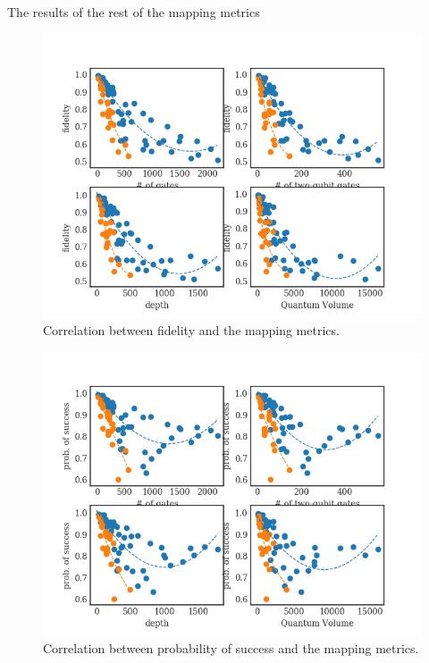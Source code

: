 The results of the rest of the mapping metrics 

\begin{figure}[htbp]
\centering
\includegraphics[width=\textwidth]{figures/f_metrics_correlation.png}
\caption{\label{fig:f_metrics_correlation}
Correlation between fidelity and the mapping metrics.}
\end{figure}

\begin{figure}[htbp]
\centering
\includegraphics[width=\textwidth]{figures/ps_metrics_correlation.png}
\caption{\label{fig:ps_metrics_correlation}
Correlation between probability of success and the mapping metrics.}
\end{figure}



